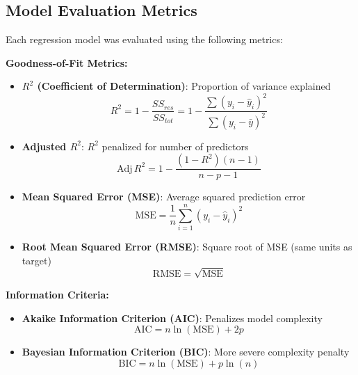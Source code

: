 \documentclass[stu,12pt,floatsintext]{apa7}
\begin{document}
\subsection{Model Evaluation Metrics}

Each regression model was evaluated using the following metrics:

\textbf{Goodness-of-Fit Metrics:}
\begin{itemize}
    \item \textbf{$R^2$ (Coefficient of Determination)}: Proportion of variance explained
    \begin{equation}
    R^2 = 1 - \frac{SS_{res}}{SS_{tot}} = 1 - \frac{\sum (y_i - \hat{y}_i)^2}{\sum (y_i - \bar{y})^2}
    \end{equation}

    \item \textbf{Adjusted $R^2$}: $R^2$ penalized for number of predictors
    \begin{equation}
    \mathrm{Adj}\,R^2 = 1 - \frac{(1 - R^2)(n - 1)}{n - p - 1}
    \end{equation}

    \item \textbf{Mean Squared Error (MSE)}: Average squared prediction error
    \begin{equation}
    \mathrm{MSE} = \frac{1}{n} \sum_{i=1}^{n} (y_i - \hat{y}_i)^2
    \end{equation}

    \item \textbf{Root Mean Squared Error (RMSE)}: Square root of MSE (same units as target)
    \begin{equation}
    \mathrm{RMSE} = \sqrt{\mathrm{MSE}}
    \end{equation}
\end{itemize}

\textbf{Information Criteria:}
\begin{itemize}
    \item \textbf{Akaike Information Criterion (AIC)}: Penalizes model complexity
    \begin{equation}
    \mathrm{AIC} = n \ln(\mathrm{MSE}) + 2p
    \end{equation}

    \item \textbf{Bayesian Information Criterion (BIC)}: More severe complexity penalty
    \begin{equation}
    \mathrm{BIC} = n \ln(\mathrm{MSE}) + p \ln(n)
    \end{equation}
\end{itemize}
\end{document}
